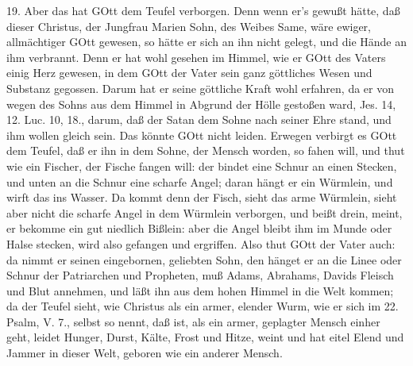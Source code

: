 19. Aber das hat GOtt dem Teufel verborgen. Denn wenn er’s gewußt hätte, daß dieser Christus, der Jungfrau Marien Sohn, des Weibes Same, wäre ewiger, allmächtiger GOtt gewesen, so hätte er sich an ihn nicht gelegt, und die Hände an ihm verbrannt. Denn er hat wohl gesehen im Himmel, wie er GOtt des Vaters einig Herz gewesen, in dem GOtt der Vater sein ganz göttliches Wesen und Substanz gegossen. Darum hat er seine göttliche Kraft wohl erfahren, da er von wegen des Sohns aus dem Himmel in Abgrund der Hölle gestoßen ward, Jes. 14, 12. Luc. 10, 18., darum, daß der Satan dem Sohne nach seiner Ehre stand, und ihm wollen gleich sein. Das könnte GOtt nicht leiden. Erwegen verbirgt es GOtt dem Teufel, daß er ihn in dem Sohne, der Mensch worden, so fahen will, und thut wie ein Fischer, der Fische fangen will: der bindet eine Schnur an einen Stecken, und unten an die Schnur eine scharfe Angel; daran hängt er ein Würmlein, und wirft das ins Wasser. Da kommt denn der Fisch, sieht das arme Würmlein, sieht aber nicht die scharfe Angel in dem Würmlein verborgen, und beißt drein, meint, er bekomme ein gut niedlich Bißlein: aber die Angel bleibt ihm im Munde oder Halse stecken, wird also gefangen und ergriffen. Also thut GOtt der Vater auch: da nimmt er seinen eingebornen, geliebten Sohn, den hänget er an die Linee oder Schnur der Patriarchen und Propheten, muß Adams, Abrahams, Davids Fleisch und Blut annehmen, und läßt ihn aus dem hohen Himmel in die Welt kommen; da der Teufel sieht, wie Christus als ein armer, elender Wurm, wie er sich im 22. Psalm, V. 7., selbst so nennt, daß ist, als ein armer, geplagter Mensch einher geht, leidet Hunger, Durst, Kälte, Frost und Hitze, weint und hat eitel Elend und Jammer in dieser Welt, geboren wie ein anderer Mensch.

